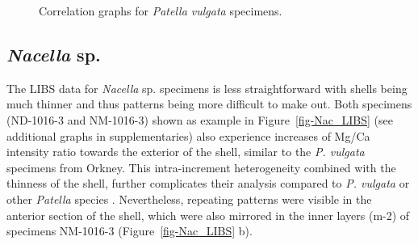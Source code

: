 \documentclass[
  authoryear,
  preprint,
  3p]{elsarticle}
\begin{document}
\begin{figure}


\caption{\label{fig-Pat_Corr}Correlation graphs for \emph{Patella
vulgata} specimens.}

\end{figure}%

\subsection{\texorpdfstring{\emph{Nacella}
sp.}{Nacella sp.}}\label{nacella-sp.}

The LIBS data for \emph{Nacella} sp. specimens is less straightforward
with shells being much thinner and thus patterns being more difficult to
make out. Both specimens (ND-1016-3 and NM-1016-3) shown as example in
Figure~\ref{fig-Nac_LIBS} (see additional graphs in supplementaries)
also experience increases of Mg/Ca intensity ratio towards the exterior
of the shell, similar to the \emph{P. vulgata} specimens from Orkney.
This intra-increment heterogeneity combined with the thinness of the
shell, further complicates their analysis compared to \emph{P. vulgata}
or other \emph{Patella} species \citep{Hausmann2019-fi}. Nevertheless,
repeating patterns were visible in the anterior section of the shell,
which were also mirrored in the inner layers (m-2) of specimens
NM-1016-3 (Figure~\ref{fig-Nac_LIBS} b).
\end{document}
